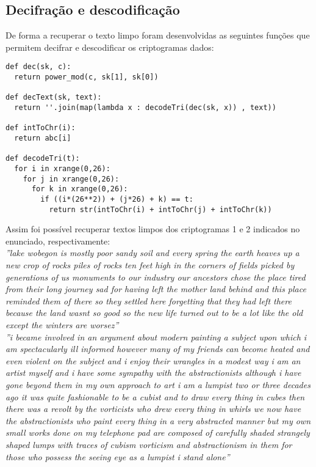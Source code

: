 \subsection{Decifração e descodificação}\label{subsec:decode}
De forma a recuperar o texto limpo foram desenvolvidas as seguintes funções que permitem decifrar e descodificar os criptogramas dados:
\begin{lstlisting}[style=sage]
def dec(sk, c):
  return power_mod(c, sk[1], sk[0])

def decText(sk, text):
  return ''.join(map(lambda x : decodeTri(dec(sk, x)) , text))

def intToChr(i):
  return abc[i]

def decodeTri(t):
  for i in xrange(0,26):
    for j in xrange(0,26):
      for k in xrange(0,26):
        if ((i*(26**2)) + (j*26) + k) == t:
          return str(intToChr(i) + intToChr(j) + intToChr(k))
\end{lstlisting}
Assim foi possível recuperar textos limpos dos criptogramas 1 e 2 indicados no enunciado, respectivamente:\\
\textit{''lake wobegon is mostly poor sandy soil and every spring the earth heaves up a new crop of rocks piles of rocks ten feet high in the corners of fields picked by generations of us monuments to our industry our ancestors chose the place tired from their long journey sad for having left the mother land behind and this place reminded them of there so they settled here forgetting that they had left there because the land wasnt so good so the new life turned out to be a lot like the old except the winters are worsez''} \\
\textit{''i became involved in an argument about modern painting a subject upon which i am spectacularly ill informed however many of my friends can become heated and even violent on the subject and i enjoy their wrangles in a modest way i am an artist myself and i have some sympathy with the abstractionists although i have gone beyond them in my own approach to art i am a lumpist two or three decades ago it was quite fashionable to be a cubist and to draw every thing in cubes then there was a revolt by the vorticists who drew every thing in whirls we now have the abstractionists who paint every thing in a very abstracted manner but my own small works done on my telephone pad are composed of carefully shaded strangely shaped lumps with traces of cubism vorticism and abstractionism in them for those who possess the seeing eye as a lumpist i stand alone''}
